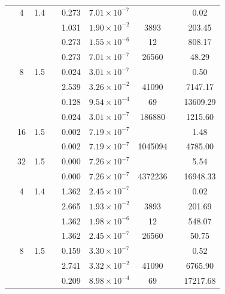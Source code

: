 \begin{table}[htbp]
\begin{tabular}{l S[table-format=3.0] S[table-format=4.1] l S[table-format=3.3] S[table-format=1.2e2] S[table-format=6.0] S[table-format=2.0] S[table-format=4.2]}
    \midrule
     & 4 & 1.4 &  & 0.273 & $7.01 \times 10^{-7}$ & {\text{---}} & {\text{---}} & 0.02 \\
     &  &  &  & 1.031 & $1.90 \times 10^{-2}$ & 3893 & {\text{---}} & 203.45 \\
     &  &  &  & 0.273 & $1.55 \times 10^{-6}$ & 12 & {\text{---}} & 808.17 \\
     &  &  &  & 0.273 & $7.01 \times 10^{-7}$ & 26560 & {\text{---}} & 48.29 \\
     & 8 & 1.5 &  & 0.024 & $3.01 \times 10^{-7}$ & {\text{---}} & {\text{---}} & 0.50 \\
     &  &  &  & 2.539 & $3.26 \times 10^{-2}$ & 41090 & {\text{---}} & 7147.17 \\
     &  &  &  & 0.128 & $9.54 \times 10^{-4}$ & 69 & {\text{---}} & 13609.29 \\
     &  &  &  & 0.024 & $3.01 \times 10^{-7}$ & 186880 & {\text{---}} & 1215.60 \\
     & 16 & 1.5 &  & 0.002 & $7.19 \times 10^{-7}$ & {\text{---}} & {\text{---}} & 1.48 \\
     &  &  &  & 0.002 & $7.19 \times 10^{-7}$ & 1045094 & {\text{---}} & 4785.00 \\
     & 32 & 1.5 &  & 0.000 & $7.26 \times 10^{-7}$ & {\text{---}} & {\text{---}} & 5.54 \\
     &  &  &  & 0.000 & $7.26 \times 10^{-7}$ & 4372236 & {\text{---}} & 16948.33 \\
    \midrule
     & 4 & 1.4 &  & 1.362 & $2.45 \times 10^{-7}$ & {\text{---}} & {\text{---}} & 0.02 \\
     &  &  &  & 2.665 & $1.93 \times 10^{-2}$ & 3893 & {\text{---}} & 201.69 \\
     &  &  &  & 1.362 & $1.98 \times 10^{-6}$ & 12 & {\text{---}} & 548.07 \\
     &  &  &  & 1.362 & $2.45 \times 10^{-7}$ & 26560 & {\text{---}} & 50.75 \\
     & 8 & 1.5 &  & 0.159 & $3.30 \times 10^{-7}$ & {\text{---}} & {\text{---}} & 0.52 \\
     &  &  &  & 2.741 & $3.32 \times 10^{-2}$ & 41090 & {\text{---}} & 6765.90 \\
     &  &  &  & 0.209 & $8.98 \times 10^{-4}$ & 69 & {\text{---}} & 17217.68 \\

\end{tabular}
\end{table}
